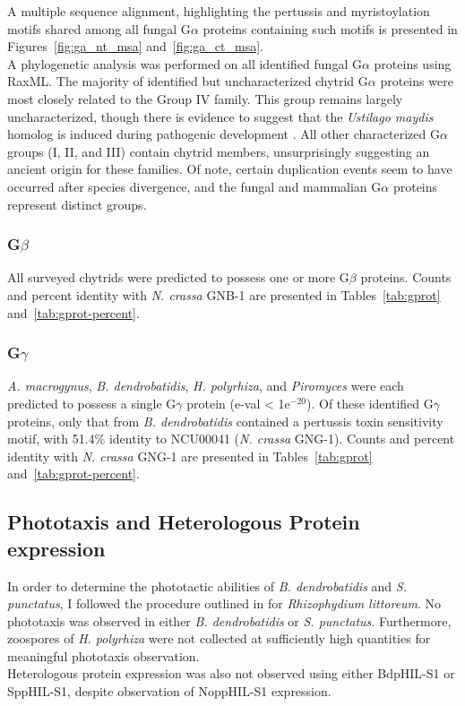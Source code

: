 \indent A multiple sequence alignment, highlighting the pertussis and myristoylation motifs shared among all fungal G$\alpha$ proteins containing such motifs is presented in Figures~\ref{fig:ga_nt_msa} and~\ref{fig:ga_ct_msa}.\\
\indent A phylogenetic analysis was performed on all identified fungal G$\alpha$ proteins using RaxML. The majority of identified but uncharacterized chytrid G$\alpha$ proteins were most closely related to the Group IV family. This group remains largely uncharacterized, though there is evidence to suggest that the \textit{Ustilago maydis} homolog is induced during pathogenic development \cite{Bolker1998}. All other characterized G$\alpha$ groups (I, II, and III) contain chytrid members, unsurprisingly suggesting an ancient origin for these families. Of note, certain duplication events seem to have occurred after species divergence, and the fungal and mammalian G$\alpha$ proteins represent distinct groups.\\
\subsubsection*{G$\beta$}
All surveyed chytrids were predicted to possess one or more G$\beta$ proteins. Counts and percent identity with \textit{N. crassa} GNB-1 are presented in Tables~\ref{tab:gprot} and~\ref{tab:gprot-percent}.
\subsubsection*{G$\gamma$}
\textit{A. macrogynus}, \textit{B. dendrobatidis}, \textit{H. polyrhiza}, and \textit{Piromyces} were each predicted to possess a single G$\gamma$ protein (e-val < 1e$^{-20}$). Of these identified G$\gamma$ proteins, only that from \textit{B. dendrobatidis} contained a pertussis toxin sensitivity motif, with 51.4\% identity to NCU00041 (\textit{N. crassa} GNG-1). Counts and percent identity with \textit{N. crassa} GNG-1 are presented in Tables~\ref{tab:gprot} and~\ref{tab:gprot-percent}.
\subsection*{Phototaxis and Heterologous Protein expression}
In order to determine the phototactic abilities of \textit{B. dendrobatidis} and \textit{S. punctatus}, I followed the procedure outlined in \cite{Muehlstein1987} for \textit{Rhizophydium littoreum}. No phototaxis was observed in either \textit{B. dendrobatidis} or \textit{S. punctatus}. Furthermore, zoospores of \textit{H. polyrhiza} were not collected at sufficiently high quantities for meaningful phototaxis observation.\\
\indent Heterologous protein expression was also not observed using either BdpHIL-S1 or SppHIL-S1, despite observation of NoppHIL-S1 expression.\\ 
